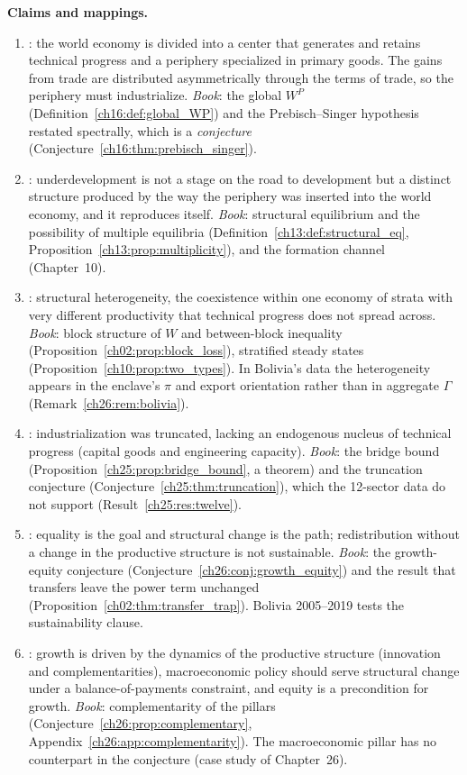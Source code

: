 \documentclass[../solutions_manual.tex]{subfiles}
\begin{document}
 \textbf{Claims and mappings.}
\begin{enumerate}
\item \citet{prebisch1949desarrollo}: the world economy is divided into a center that generates and retains technical progress and a periphery specialized in primary goods. The gains from trade are distributed asymmetrically through the terms of trade, so the periphery must industrialize. \emph{Book}: the global $W^P$ (Definition~\ref{ch16:def:global_WP}) and the Prebisch--Singer hypothesis restated spectrally, which is a \emph{conjecture} (Conjecture~\ref{ch16:thm:prebisch_singer}).
\item \citet{furtado1961desenvolvimento}: underdevelopment is not a stage on the road to development but a distinct structure produced by the way the periphery was inserted into the world economy, and it reproduces itself. \emph{Book}: structural equilibrium and the possibility of multiple equilibria (Definition~\ref{ch13:def:structural_eq}, Proposition~\ref{ch13:prop:multiplicity}), and the formation channel (Chapter~10).
\item \citet{pinto1970naturaleza}: structural heterogeneity, the coexistence within one economy of strata with very different productivity that technical progress does not spread across. \emph{Book}: block structure of $W$ and between-block inequality (Proposition~\ref{ch02:prop:block_loss}), stratified steady states (Proposition~\ref{ch10:prop:two_types}). In Bolivia's data the heterogeneity appears in the enclave's $\pi$ and export orientation rather than in aggregate $\Gamma$ (Remark~\ref{ch26:rem:bolivia}).
\item \citet{fajnzylber1983industrializacion}: industrialization was truncated, lacking an endogenous nucleus of technical progress (capital goods and engineering capacity). \emph{Book}: the bridge bound (Proposition~\ref{ch25:prop:bridge_bound}, a theorem) and the truncation conjecture (Conjecture~\ref{ch25:thm:truncation}), which the 12-sector data do not support (Result~\ref{ch25:res:twelve}).
\item \citet{cepal2012structural}: equality is the goal and structural change is the path; redistribution without a change in the productive structure is not sustainable. \emph{Book}: the growth-equity conjecture (Conjecture~\ref{ch26:conj:growth_equity}) and the result that transfers leave the power term unchanged (Proposition~\ref{ch02:thm:transfer_trap}). Bolivia 2005--2019 tests the sustainability clause.
\item \citet{ocampo2009growth}: growth is driven by the dynamics of the productive structure (innovation and complementarities), macroeconomic policy should serve structural change under a balance-of-payments constraint, and equity is a precondition for growth. \emph{Book}: complementarity of the pillars (Conjecture~\ref{ch26:prop:complementary}, Appendix~\ref{ch26:app:complementarity}). The macroeconomic pillar has no counterpart in the conjecture (case study of Chapter~26).
\end{enumerate}
\end{document}
